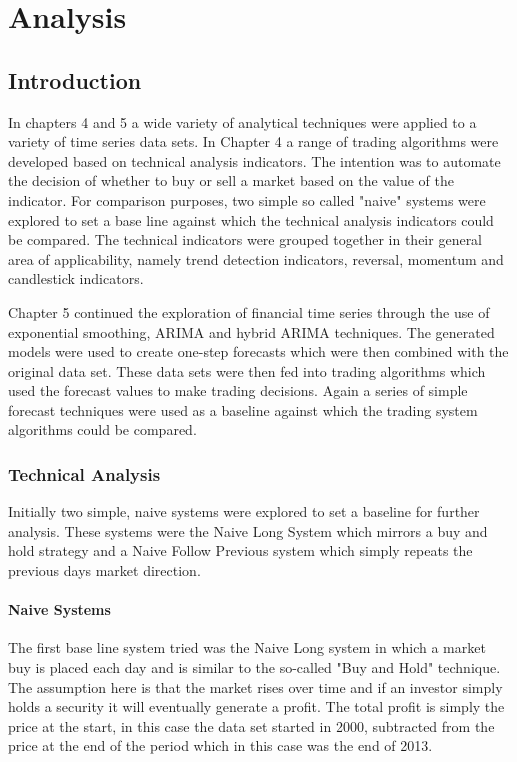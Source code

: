 
\chapter{Analysis} %

\label{Chapter6} %



\section{Introduction}
In chapters 4 and 5 a wide variety of analytical techniques were applied to a variety of time series data sets. In Chapter 4 a range of trading algorithms were developed based on technical analysis indicators.  The intention was to automate the decision of whether to buy or sell a market based on the value of the indicator. For comparison purposes, two simple so called "naive" systems were explored to set a base line against which the technical analysis indicators could be compared.  The technical indicators were grouped together in their general area of applicability, namely trend detection indicators, reversal, momentum and candlestick indicators.

Chapter 5 continued the exploration of financial time series through the use of exponential smoothing, ARIMA and hybrid ARIMA techniques. The generated models were used to create one-step forecasts which were then combined with the original data set. These data sets were then fed into trading algorithms which used the forecast values to make trading decisions. Again a series of simple forecast techniques were used as a baseline against which the trading system algorithms could be compared.

\subsection{Technical Analysis}
Initially two simple, naive systems were explored to set a baseline for further analysis. These systems were the Naive Long System which mirrors a buy and hold strategy and a Naive Follow Previous system which simply repeats the previous days market direction.

\subsubsection{Naive Systems}
The first base line system tried was the Naive Long system in which a market buy is placed each day and is similar to the so-called "Buy and Hold" technique. The assumption here is that the market rises over time and if an investor simply holds a security it will eventually generate a profit.  The total profit is simply the price at the start, in this case the data set started in 2000, subtracted from the price at the end of the period which in this case was the end of 2013.

